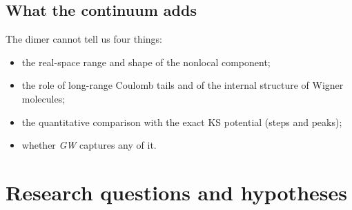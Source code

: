 \documentclass[11pt,a4paper]{article}
\newcommand{\GW}{\textit{GW}}
\begin{document}
\subsection{What the continuum adds}
The dimer cannot tell us four things:
\begin{itemize}
\item the real-space range and shape of the nonlocal component;
\item the role of long-range Coulomb tails and of the internal structure of Wigner molecules;
\item the quantitative comparison with the exact KS potential (steps and peaks);
\item whether \GW{} captures any of it.
\end{itemize}

\section{Research questions and hypotheses}
\end{document}
